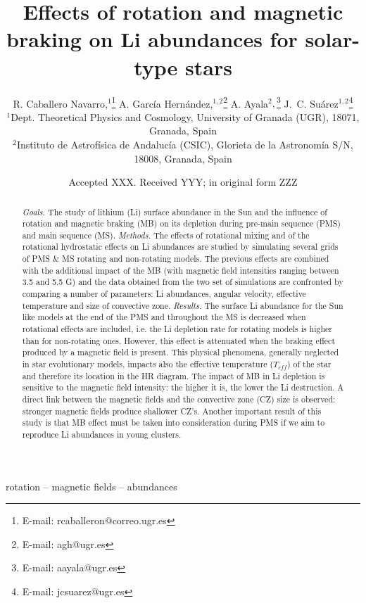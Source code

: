 \documentclass[fleqn,usenatbib]{mnras}
\title[Rotation, magnetic braking \& Li abundances]{Effects of rotation and magnetic braking on Li abundances for solar-type stars}
\author[R. Caballero Navarro et al.]{
R. Caballero Navarro,$^{1}$\thanks{E-mail: rcaballeron@correo.ugr.es}
A. Garc\'ia Hern\'andez,$^{1,2}$\thanks{E-mail: agh@ugr.es}
A. Ayala$^{2},$\thanks{E-mail: aayala@ugr.es}
J.~C. Su\'arez$^{1,2}$\thanks{E-mail: jcsuarez@ugr.es}
\\
$^{1}$Dept. Theoretical Physics and Cosmology, University of Granada (UGR), 18071, Granada, Spain\\
$^{2}$Instituto de Astrof\'isica de Andaluc\'ia (CSIC), Glorieta de la Astronom\'ia S/N, 18008, Granada, Spain\\
}
\date{Accepted XXX. Received YYY; in original form ZZZ}
\begin{document}
\label{firstpage}
\pagerange{\pageref{firstpage}--\pageref{lastpage}}
\maketitle

\begin{abstract}
\textit{Goals.} The study of lithium (Li) surface abundance in the Sun and the influence of rotation and magnetic braking (MB) on its depletion during pre-main sequence (PMS) and main sequence (MS).
\newline\textit{Methods.} The effects of rotational mixing and of the rotational hydrostatic effects on Li abundances are studied by simulating several grids of PMS \& MS rotating and non-rotating models. The previous effects are combined with the additional impact of the MB (with magnetic field intensities ranging between 3.5 and 5.5 G) and the data obtained from the two set of simulations are confronted by comparing a number of parameters: Li abundances, angular velocity, effective temperature and size of convective zone.
\newline\textit{Results.} The surface Li abundance for the Sun like models at the end of the PMS and throughout the MS is decreased when rotational effects are included, i.e. the Li depletion rate for rotating models is higher than for non-rotating ones. However, this effect is attenuated when the braking effect produced by a magnetic field is present. This physical phenomena, generally neglected in star evolutionary models, impacts also the effective temperature ($T_{eff}$) of the star and therefore its location in the HR diagram. The impact of MB in Li depletion is sensitive to the magnetic field intensity: the higher it is, the lower the Li destruction. A direct link between the magnetic fields and the convective zone (CZ) size is observed: stronger magnetic fields produce shallower CZ's. Another important result of this study is that MB effect must be taken into consideration during PMS if we aim to reproduce Li abundances in young clusters.
\end{abstract}

\begin{keywords}
rotation -- magnetic fields -- abundances
\end{keywords}

\end{document}
